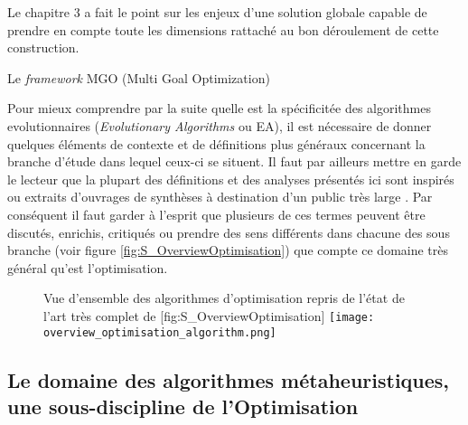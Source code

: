 



Le chapitre 3 a fait le point sur les enjeux d'une solution globale capable de prendre en compte toute les dimensions rattaché au bon déroulement de cette construction.

Le \textit{framework} MGO (Multi Goal Optimization) 

Pour mieux comprendre par la suite quelle est la spécificitée des algorithmes evolutionnaires (\textit{Evolutionary Algorithms} ou EA), il est nécessaire de donner quelques éléments de contexte et de définitions plus généraux concernant la branche d'étude dans lequel ceux-ci se situent. Il faut par ailleurs mettre en garde le lecteur que la plupart des définitions et des analyses présentés ici sont inspirés ou extraits d'ouvrages de synthèses à destination d'un public très large \autocites{Weise2011, Luke2013, Brownlee2012}. Par conséquent il faut garder à l'esprit que plusieurs de ces termes peuvent être discutés, enrichis, critiqués ou prendre des sens différents dans chacune des sous branche (voir figure \ref{fig:S_OverviewOptimisation}) que compte ce domaine très général qu'est l'optimisation.

\begin{figure}[h]
\begin{sidecaption}[fortoc]{ Vue d'ensemble des algorithmes d'optimisation repris de l'état de l'art très complet de \textcite[32]{Weise2011}}[fig:S_OverviewOptimisation]
  \centering
 \texttt{[image: overview\_optimisation\_algorithm.png]}
  \end{sidecaption}
\end{figure}

\subsection{Le domaine des algorithmes métaheuristiques, une sous-discipline de l'Optimisation}

